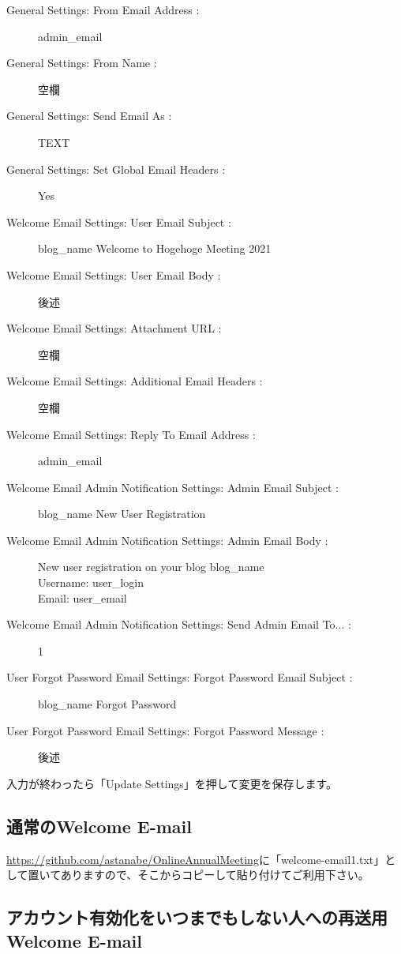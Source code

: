 \documentclass[titlepage,10pt,a4paper,uplatex]{jsbook}
\begin{document}
\begin{description}
\item[General Settings: From Email Address : ] {\lbrack}admin\_email{\rbrack}
\item[General Settings: From Name : ] 空欄
\item[General Settings: Send Email As : ] TEXT
\item[General Settings: Set Global Email Headers : ] Yes
\item[Welcome Email Settings: User Email Subject : ] {\lbrack}{\lbrack}blog\_name{\rbrack}{\rbrack} Welcome to Hogehoge Meeting 2021
\item[Welcome Email Settings: User Email Body : ] 後述
\item[Welcome Email Settings: Attachment URL : ] 空欄
\item[Welcome Email Settings: Additional Email Headers : ] 空欄
\item[Welcome Email Settings: Reply To Email Address : ] {\lbrack}admin\_email{\rbrack}
\item[Welcome Email Admin Notification Settings: Admin Email Subject : ] {\lbrack}{\lbrack}blog\_name{\rbrack}{\rbrack} New User Registration
\item[Welcome Email Admin Notification Settings: Admin Email Body : ] New user registration on your blog {\lbrack}blog\_name{\rbrack}\\
Username: {\lbrack}user\_login{\rbrack}\\
Email: {\lbrack}user\_email{\rbrack}
\item[Welcome Email Admin Notification Settings: Send Admin Email To... : ] 1
\item[User Forgot Password Email Settings: Forgot Password Email Subject : ] {\lbrack}{\lbrack}blog\_name{\rbrack}{\rbrack} Forgot Password
\item[User Forgot Password Email Settings: Forgot Password Message : ] 後述
\end{description}

入力が終わったら「Update Settings」を押して変更を保存します。

\subsection{通常のWelcome E-mail}

\url{https://github.com/astanabe/OnlineAnnualMeeting}に「welcome-email1.txt」として置いてありますので、そこからコピーして貼り付けてご利用下さい。

\subsection{アカウント有効化をいつまでもしない人への再送用Welcome E-mail}
\end{document}
